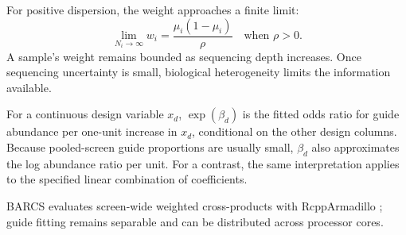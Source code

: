 For positive dispersion, the weight approaches a finite limit:
\begin{equation}
  \lim_{N_i\rightarrow\infty} w_i
  = \frac{\mu_i(1-\mu_i)}{\rho}
  \quad\text{when }\rho>0.
\end{equation}
A sample's weight remains bounded as sequencing depth increases.  Once
sequencing uncertainty is small, biological heterogeneity limits the
information available.

For a continuous design variable $x_d$, $\exp(\beta_d)$ is the fitted odds
ratio for guide abundance per one-unit increase in $x_d$, conditional on the
other design columns.  Because pooled-screen guide proportions are usually
small, $\beta_d$ also approximates the log abundance ratio per unit.  For a
contrast, the same interpretation applies to the specified linear combination
of coefficients.

BARCS evaluates screen-wide weighted cross-products with RcppArmadillo
\citep{eddelbuettel2014rcpparmadillo}; guide fitting remains separable and can
be distributed across processor cores.
